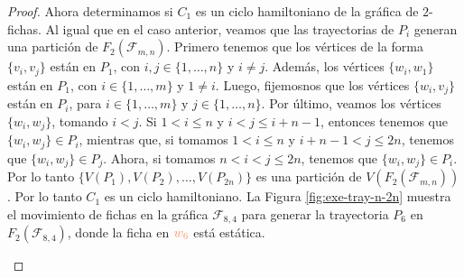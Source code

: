 \begin{proof}
    Ahora determinamos si $C_1$ es un ciclo hamiltoniano de la gr\'afica de
    $2$-fichas. Al igual que en el caso anterior, veamos que las trayectorias de
    $P_i$ generan una partici\'on de $F_2(\mathcal{F}_{m,n})$. Primero tenemos que los
    v\'ertices de la forma $\{v_i,v_j\}$ est\'an en $P_1$, con $i,j \in \{1,
    \dots, n\}$ y $i \neq j$. Adem\'as, los v\'ertices $\{w_i,w_1\}$
    est\'an en $P_1$, con $i \in \{1, \dots, m\}$ y $1 \neq i$. Luego,
    fijemosnos que los v\'ertices $\{w_i,v_j\}$ est\'an en $P_i$, para $i\in
    \{1, \dots, m\}$ y $j \in \{1, \dots, n\}$. Por \'ultimo, veamos los
    v\'ertices $\{w_i,w_j\}$, tomando $i < j$. Si $1 < i \leq n$ y $i <
    j \leq i+n-1$, entonces tenemos que $\{w_i,w_j\} \in P_i$, mientras que, si
    tomamos $1 < i \leq n$ y $i+n-1 < j \leq 2n$, tenemos que $\{w_i,w_j\} \in
    P_j$. Ahora, si tomamos $n<i<j \leq 2n$, tenemos que $\{w_i,w_j\} \in P_i$.
    Por lo tanto $\{V(P_1),V(P_2), \dots, V(P_{2n})\}$ es una partici\'on de
    $V(F_2(\mathcal{F}_{m,n}))$. Por lo tanto $C_1$ es un ciclo hamiltoniano. La Figura
    \ref{fig:exe-tray-n-2n} muestra el movimiento de fichas en la gr\'afica
    $\mathcal{F}_{8,4}$ para generar la trayectoria $P_6$ en $F_2(\mathcal{F}_{8,4})$, donde la
    ficha en ${\color{coral}w_6}$ est\'a est\'atica.


    \begin{figure}[ht!]
        \centering
\end{figure}
\end{proof}
